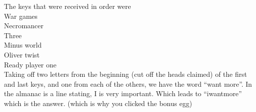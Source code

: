 \documentclass[12pt]{article}
\begin{document}
The keys that were received in order were\\
War games\\
Necromancer\\
Three\\
Minus world\\
Oliver twist\\
Ready player one\\

Taking off two letters from the beginning (cut off the heads claimed) of the first and last keys, and one from each of the others, we have the word ``want more''. In the almanac is a line stating, I is very important. Which leads to ``iwantmore'' which is the answer. (which is why you clicked the bonus egg)
\end{document}
